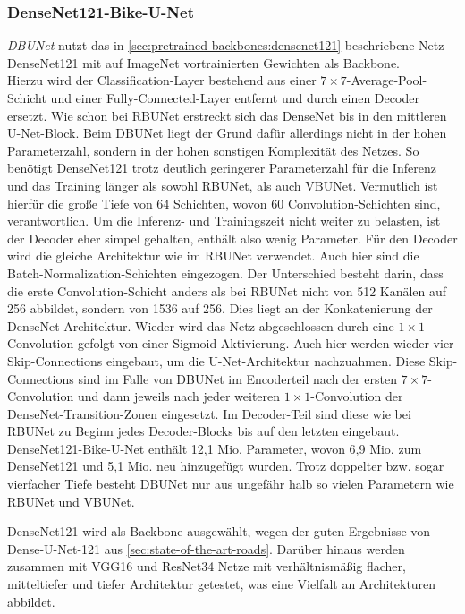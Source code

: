 \subsubsection{DenseNet121-Bike-U-Net}

\textit{\ac{DBUNet}} nutzt das in \autoref{sec:pretrained-backbones:densenet121} beschriebene Netz DenseNet121 
mit auf ImageNet vortrainierten Gewichten als Backbone. \\
Hierzu wird der Classification-Layer bestehend aus einer $7\times 7$-Average-Pool-Schicht 
und einer Fully-Connected-Layer entfernt und durch einen Decoder ersetzt. 
Wie schon bei \ac{RBUNet} erstreckt sich das DenseNet bis in den mittleren U-Net-Block. Beim \ac{DBUNet} 
liegt der Grund dafür allerdings nicht in der hohen Parameterzahl, sondern in der hohen sonstigen Komplexität 
des Netzes. So benötigt DenseNet121 trotz deutlich geringerer Parameterzahl für die Inferenz und das Training länger 
als sowohl \ac{RBUNet}, als auch \ac{VBUNet}. Vermutlich ist hierfür die große Tiefe von 64 Schichten, wovon 
60 Convolution-Schichten sind, verantwortlich. Um die Inferenz- und Trainingszeit nicht weiter zu belasten, 
ist der Decoder eher simpel gehalten, enthält also wenig Parameter. Für den Decoder wird die gleiche Architektur wie im \ac{RBUNet} verwendet.
Auch hier sind die Batch-Normalization-Schichten eingezogen. Der Unterschied besteht darin, 
dass die erste Convolution-Schicht anders als bei \ac{RBUNet} nicht von 512 Kanälen auf 256 abbildet, 
sondern von 1536 auf 256. Dies liegt an der Konkatenierung der DenseNet-Architektur. Wieder wird das 
Netz abgeschlossen durch eine $1\times 1$-Convolution gefolgt von einer Sigmoid-Aktivierung. 
Auch hier werden wieder vier Skip-Connections eingebaut, um die U-Net-Architektur nachzuahmen. 
Diese Skip-Connections sind im Falle von \ac{DBUNet} im Encoderteil nach der ersten $7 \times 7$-Convolution 
und dann jeweils nach jeder weiteren $1\times 1$-Convolution der DenseNet-Transition-Zonen eingesetzt. 
Im Decoder-Teil sind diese wie bei \ac{RBUNet} zu Beginn jedes Decoder-Blocks bis auf den letzten eingebaut. \\
DenseNet121-Bike-U-Net enthält 12,1 Mio. Parameter, wovon 6,9 Mio. zum DenseNet121 und 5,1 Mio. neu hinzugefügt 
wurden. Trotz doppelter bzw. sogar vierfacher Tiefe besteht \ac{DBUNet} nur aus ungefähr halb so vielen 
Parametern wie \ac{RBUNet} und \ac{VBUNet}. 

DenseNet121 wird als Backbone ausgewählt, wegen der guten Ergebnisse von Dense-U-Net-121 aus \autoref{sec:state-of-the-art-roads}. 
Darüber hinaus werden zusammen mit VGG16 und ResNet34 Netze mit verhältnismäßig flacher, mitteltiefer und tiefer 
Architektur getestet, was eine Vielfalt an Architekturen abbildet.

